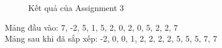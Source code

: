 \documentclass[a4paper,12pt]{article}
\begin{document}
\begin{figure}[!h]
	\centerline{}
	\caption{Kết quả của Assignment 3}
	\label{fig:ass3}
\end{figure}
\noindent
Mảng đầu vào: 7, -2, 5, 1, 5, 2, 0, 2, 0, 5, 2, 2, 7 \\
Mảng sau khi đã sắp xếp: -2, 0, 0, 1, 2, 2, 2, 2, 5, 5, 5, 7, 7 
\clearpage
\end{document}
